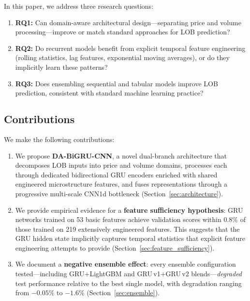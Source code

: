 \documentclass[11pt,a4paper]{article}
\newcommand{\methodname}{DA-BiGRU-CNN}
\begin{document}
In this paper, we address three research questions:

\begin{enumerate}[leftmargin=2em, itemsep=0.2em]
    \item \textbf{RQ1:} Can domain-aware architectural design---separating price and volume processing---improve or match standard approaches for LOB prediction?
    \item \textbf{RQ2:} Do recurrent models benefit from explicit temporal feature engineering (rolling statistics, lag features, exponential moving averages), or do they implicitly learn these patterns?
    \item \textbf{RQ3:} Does ensembling sequential and tabular models improve LOB prediction, consistent with standard machine learning practice?
\end{enumerate}

\subsection{Contributions}

We make the following contributions:

\begin{enumerate}[leftmargin=2em, itemsep=0.2em]
    \item We propose \textbf{\methodname{}}, a novel dual-branch architecture that decomposes LOB inputs into price and volume domains, processes each through dedicated bidirectional GRU encoders enriched with shared engineered microstructure features, and fuses representations through a progressive multi-scale CNN1d bottleneck (Section~\ref{sec:architecture}).

    \item We provide empirical evidence for a \textbf{feature sufficiency hypothesis}: GRU networks trained on 53 basic features achieve validation scores within 0.8\% of those trained on 219 extensively engineered features. This suggests that the GRU hidden state implicitly captures temporal statistics that explicit feature engineering attempts to provide (Section~\ref{sec:feature_sufficiency}).

    \item We document a \textbf{negative ensemble effect}: every ensemble configuration tested---including GRU+LightGBM and GRU\,v1+GRU\,v2 blends---\emph{degraded} test performance relative to the best single model, with degradation ranging from $-0.05\%$ to $-1.6\%$ (Section~\ref{sec:ensemble}).
\end{enumerate}
\end{document}
